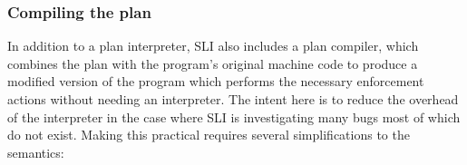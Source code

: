 

\subsubsection{Compiling the plan}
\label{sect:enforce:compiling}


In addition to a plan interpreter, SLI also includes a plan compiler, which combines the plan with the program's original machine code to produce a modified version of the program which performs the necessary enforcement actions without needing an interpreter.
The intent here is to reduce the overhead of the interpreter in the case where SLI is investigating many bugs most of which do not exist.
Making this practical requires several simplifications to the semantics:

